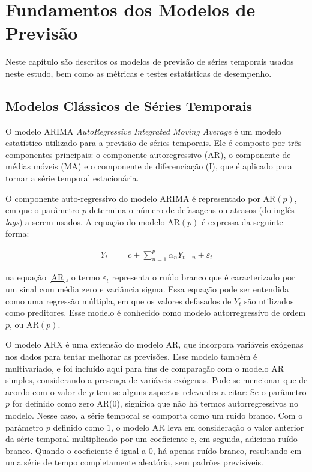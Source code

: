\section{Fundamentos dos Modelos de Previs\~ao}\label{sec:base}

 Neste capítulo são descritos os modelos de previsão de séries temporais usados neste estudo, bem como as métricas e testes estatísticas de desempenho. 
 
 \subsection{Modelos Cl\'assicos de S\'eries Temporais}\label{subsec:arima}

O modelo ARIMA \textit{AutoRegressive Integrated Moving Average} é um modelo estatístico utilizado para a previsão de séries temporais. Ele é composto por três componentes principais: o componente autoregressivo (AR), o componente de médias móveis (MA) e o componente de diferenciação (I), que é aplicado para tornar a série temporal estacionária. 

O componente auto-regressivo do modelo ARIMA é representado por AR$(p)$, em que o parâmetro $p$ determina o número de defasagens ou atrasos (do inglês \textit{lags}) a serem usados. A equação do modelo AR$(p)$ é expressa da seguinte forma:
 
 \begin{eqnarray}
 	Y_t&=&c+\sum_{n=1}^{p} \alpha_n Y_{t-n} + \varepsilon_t\label{AR}
 \end{eqnarray}
 
\noindent na equação \eqref{AR}, o termo $\varepsilon_t$ representa o ruído branco que é caracterizado por um sinal com média zero e variância sigma. Essa equação pode ser entendida como uma regressão múltipla, em que os valores defasados de $Y_t$ são utilizados como preditores. Esse modelo é conhecido como modelo autorregressivo de ordem $p$, ou AR$(p)$.
 
O modelo ARX é uma extensão do modelo AR, que incorpora variáveis exógenas nos dados para tentar melhorar as previsões. Esse modelo também é multivariado, e foi incluído aqui para fins de comparação com o modelo AR simples, considerando a presença de variáveis exógenas. Pode-se mencionar que de acordo com o valor de $p$ tem-se alguns aspectos relevantes a citar:
 Se o parâmetro $p$ for definido como zero AR($0$), significa que não há termos autorregressivos no modelo. Nesse caso, a série temporal se comporta como um ruído branco. Com o parâmetro $p$ definido como $1$, o modelo AR leva em consideração o valor anterior da série temporal multiplicado por um coeficiente e, em seguida, adiciona ruído branco. Quando o coeficiente é igual a $0$, há apenas ruído branco, resultando em uma série de tempo completamente aleatória, sem padrões previsíveis. 
 
